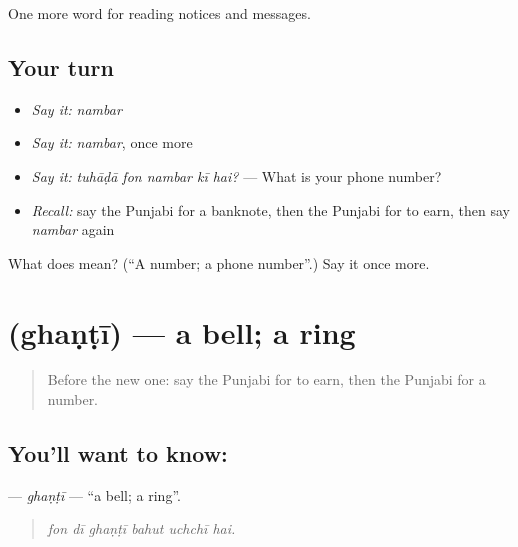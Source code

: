 \begin{grammarlens}[title={What you've built}]
One more word for reading notices and messages.
\end{grammarlens}

\subsection*{Your turn}
\begin{itemize}
\raggedright
  \item \emph{Say it:} \emph{nambar}
  \item \emph{Say it:} \emph{nambar}, once more
  \item \emph{Say it:} \emph{tuhāḍā fon nambar kī hai?} — What is your phone number?
  \item \emph{Recall:} say the Punjabi for a banknote, then the Punjabi for to earn, then say \emph{nambar} again
\end{itemize}

\begin{tcolorbox}[breakable,colback=teal!4,colframe=teal!35!black,title={Before you move on}]
What does  mean? (\textquotedblleft{}A number; a phone number\textquotedblright{}.) Say it once more.
\end{tcolorbox}
\section[\texorpdfstring{\pa{ਘੰਟੀ} (ghaṇṭī)}{ਘੰਟੀ (ghaṇṭī)}]{ (ghaṇṭī) — a bell; a ring}

\label{lesson:PA-C259-ghanti}



\begin{quote}
Before the new one: say the Punjabi for to earn, then the Punjabi for a number.
\end{quote}

\subsection*{You'll want to know: }
\textbf{} — \emph{ghaṇṭī} — \textquotedblleft{}a bell; a ring\textquotedblright{}.

\begin{quote}
     
\end{quote}

\begin{quote}
\emph{fon dī ghaṇṭī bahut uchchī hai.}
\end{quote}

